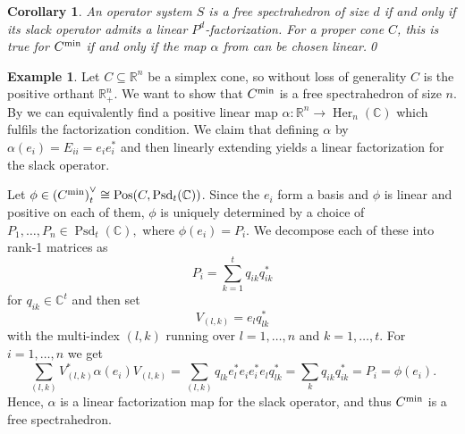 \documentclass[11pt,onecolumn]{article}
\theoremstyle{plain}
\newtheorem{corollary}[theorem]{Corollary}
\theoremstyle{definition}
\newtheorem{example}[theorem]{Example}
\newcommand{\C}{\mathbb{C}}
\newcommand{\R}{\mathbb{R}}
\begin{document}
\begin{corollary}
\label{cor:min}
    An operator system \(S\) is a free spectrahedron of size \(d\) if and only if its slack operator  admits a linear \(P^d\)-factorization. For a proper cone $C$, this is true for $C^\textnormal{min}$  if and only if the map $\alpha$ from  can be chosen linear.\qed
\end{corollary}

\begin{example} \label{ex:simplex_hedron}
Let \(C \subseteq \R^n\) be a simplex cone, so without loss of generality \(C\) is the positive orthant \(\R_{+}^n\). We want to show that \(C^\textnormal{min}\) is a free spectrahedron of size \(n\). By  we can equivalently find a positive linear map \(\alpha\colon \R^n \to \operatorname{Her}_n(\C)\) which fulfils the factorization condition. We claim that defining \(\alpha\) by \(\alpha(e_i) = E_{ii} = e_i e_i^*\) and then linearly extending yields a linear factorization for the slack operator. 

Let \(\phi \in \left(C^\textnormal{min}\right)^\lor_t \cong \operatorname{Pos}(C, \operatorname{Psd}_t(\C))\). Since the \(e_i\) form a basis and \(\phi\) is linear and positive on each of them, \(\phi\) is uniquely determined by a choice of \(P_1, \dots, P_n \in \operatorname{Psd}_t(\C),\) where \(\phi(e_i)=P_i\). We decompose each of these into rank-1 matrices as \[P_i = \sum_{k=1}^t q_{ik} q_{ik}^*\] for \(q_{ik} \in \C^t\) and then set \[V_{(l, k)} = e_l q_{l k}^*\] with the multi-index \((l, k)\) running over \(l = 1, \dots, n\) and \(k = 1, \dots, t\). For \(i = 1, \dots, n\) we get \[\sum_{(l ,k)} V_{(l, k)}^* \alpha(e_i) V_{(l, k)} = \sum_{(l, k)} q_{lk} e_l^* e_i e_i^* e_l q_{lk}^* = \sum_k q_{ik} q_{ik}^* = P_i =\phi(e_i).\] Hence, \(\alpha\) is a linear factorization map for the slack operator, and thus \(C^\textnormal{min}\) is a free spectrahedron. 
\end{example}
\end{document}
